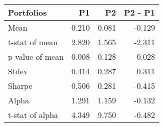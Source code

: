 \begin{tabular}{lrrr}
\toprule
Portfolios & P1 & P2 & P2 - P1 \\
\midrule
Mean & 0.210 & 0.081 & -0.129 \\
t-stat of mean & 2.820 & 1.565 & -2.311 \\
p-value of mean & 0.008 & 0.128 & 0.028 \\
Stdev & 0.414 & 0.287 & 0.311 \\
Sharpe & 0.506 & 0.281 & -0.415 \\
Alpha & 1.291 & 1.159 & -0.132 \\
t-stat of alpha & 4.349 & 9.750 & -0.482 \\
\bottomrule
\end{tabular}
